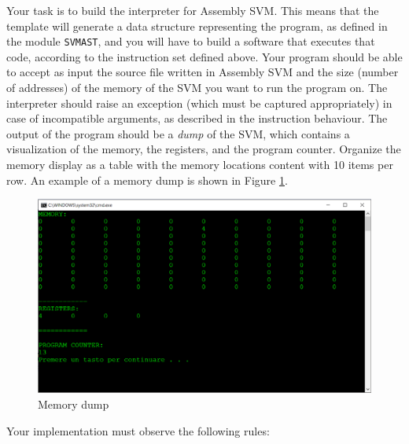 Your task is to build the interpreter for Assembly SVM. This means that the template will generate a data structure representing the program, as defined in the module \texttt{SVMAST}, and you will have to build a software that executes that code, according to the instruction set defined above. Your program should be able to accept as input the source file written in Assembly SVM and the size (number of addresses) of the memory of the SVM you want to run the program on. The interpreter should raise an exception (which must be captured appropriately) in case of incompatible arguments, as described in the instruction behaviour. The output of the program should be a \textit{dump} of the SVM, which contains a visualization of the memory, the registers, and the program counter. Organize the memory display as a table with the memory locations content with 10 items per row. An example of a memory dump is shown in Figure \ref{fig:dump}.

\begin{figure}
	\centering
	\includegraphics[width = \textwidth]{Figures/dump}
	\caption{Memory dump}
	\label{fig:dump}
\end{figure}

\noindent
Your implementation must observe the following rules:

